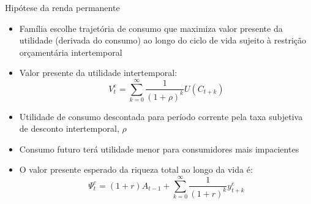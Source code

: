 \documentclass[10pt]{beamer}
\begin{document}
\begin{frame}
    {Hipótese da renda permanente}
    \begin{itemize}
        \item Família escolhe trajetória de consumo que maximiza valor presente da utilidade (derivada do consumo) ao longo do ciclo de vida sujeito à restrição orçamentária intertemporal\bigskip
        \item Valor presente da utilidade intertemporal:
        \begin{equation}
            V_t^e = \sum_{k = 0}^\infty \frac{1}{(1 + \rho)^k}U(C_{t + k})
            \label{aula7_eq3}
        \end{equation}
        \item Utilidade de consumo descontada para período corrente pela taxa subjetiva de desconto intertemporal, $\rho$\bigskip
        \item Consumo futuro terá utilidade menor para consumidores mais impacientes\bigskip
        \item O valor presente esperado da riqueza total ao longo da vida é:
        \begin{equation}
            \Psi_t^e = (1 + r)A_{t-1} + \sum_{k=0}^\infty \frac{1}{(1 + r)^k}y_{t+k}^e
            \label{aula7_eq4} 
        \end{equation}
    \end{itemize}
\end{frame}
\end{document}
